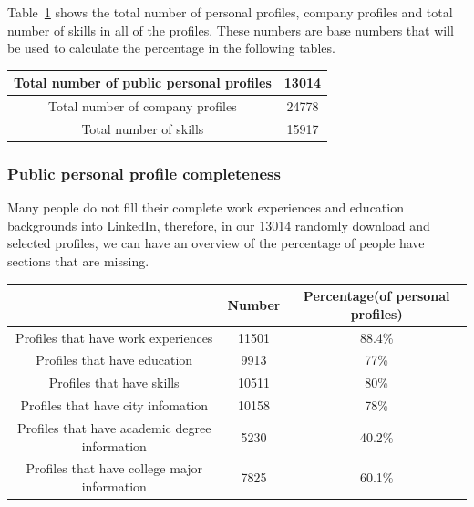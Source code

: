 Table~\ref{tab:NumCount} shows the total number of personal profiles, company profiles and total number of skills in all of the profiles. These numbers are base numbers that will be used to calculate the percentage in the following tables.

\begin{table}[H]
    \begin{tabular}{|c|c|}
    \hline
    Total number of public personal profiles & 13014 \\ \hline
    Total number of company profiles         & 24778 \\ \hline
    Total number of skills                   & 15917 \\ \hline
    \end{tabular}
  	\label{tab:NumCount}
\end{table}

\subsubsection{Public personal profile completeness}

Many people do not fill their complete work experiences and education backgrounds into LinkedIn, therefore, in our 13014 randomly download and selected profiles, we can have an overview of the percentage of people have sections that are missing.

\begin{table}[H]
    \begin{tabular}{|c|c|c|}
    \hline
    ~                                                             & Number & Percentage(of personal profiles) \\ \hline
    Profiles that have work experiences                           & 11501  & 88.4\%                             \\ \hline
    Profiles that have education                                  & 9913   & 77\%                               \\ \hline
    Profiles that have skills                                     & 10511  & 80\%                               \\ \hline
    Profiles that have city infomation & 10158  & 78\%                               \\ \hline
    Profiles that have academic degree information                & 5230   & 40.2\%                             \\ \hline
    Profiles that have college major information                  & 7825   & 60.1\%                             \\ \hline
    \end{tabular}
\end{table}

